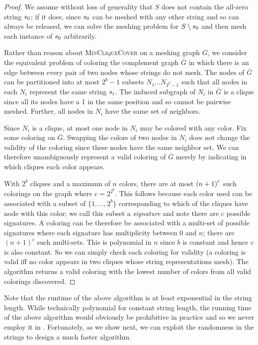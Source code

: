 \begin{proof}
We assume without loss of generality that $S$ does not contain the
all-zero string $s_0$; if it does, since $s_0$ can be meshed
with any other string and so can always be released, we can solve the
meshing problem for $S \setminus s_0$ and then mesh each instance
of $s_0$ arbitrarily.

Rather than reason about {\textsc{MinCliqueCover}} on a
 meshing graph $G$, we consider the equivalent
problem of coloring the complement graph $\bar{G}$ in which there is
an edge between every pair of two nodes whose strings do not mesh. The nodes of $\bar{G}$ can be partitioned into at most $2^b-1$
subsets $N_1 \ldots N_{2^b-1}$ such that all nodes in each
$N_i$ represent the same string $s_i$.  The induced subgraph of
$N_i$ in $\bar{G}$ is a clique since all its nodes have a 1 in the same position and so cannot be pairwise meshed.  Further, all nodes in $N_i$ have the same set of neighbors.

Since $N_i$ is a clique, at most one node in $N_i$ may be colored with
any color.  Fix some coloring on $\bar{G}$.  Swapping the colors of
two nodes in $N_i$ does not change the validity of the coloring since
these nodes have the same neighbor set.  We can therefore
unambiguously represent a valid coloring of $\bar{G}$ merely by
indicating in which cliques each color appears.

With $2^b$ cliques and a maximum of $n$ colors, there are at most $\left(
n+1 \right) ^{c}$ such colorings on the graph where $c=2^{2^b}$. This follows because each color used can be associated with a subset of $\{1, \ldots, 2^b\}$ corresponding to which of the cliques have node with this color; we call this subset a \emph{signature} and note there are $c$ possible signatures. A coloring can be therefore be associated with a multi-set of possible signatures where each signature has multiplicity between 0 and $n$; there are $(n+1)^c$ such multi-sets. This is polynomial in $n$ since $b$ is constant and hence $c$ is also constant. So we can simply check each coloring for validity (a coloring is valid iff no color appears in two cliques whose string representations mesh). The algorithm returns a valid coloring with the lowest number of colors from all valid colorings discovered.
\end{proof}

Note that the runtime of the above algorithm is at least exponential in the string length. While technically polynomial for constant string length, the running time of the above algorithm would obviously be prohibitive in practice and so we never employ it in \Mesh{}. Fortunately, as we show next, we can exploit the randomness in the strings to design a much faster algorithm.


